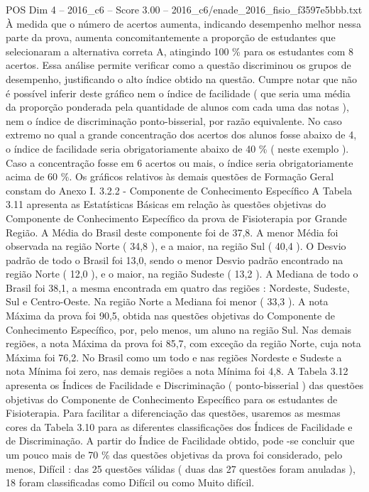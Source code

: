 \begin{textsample}{POS Dim 4 – 2016\_c6 – Score 3.00 – 2016\_c6/enade\_2016\_fisio\_f3597e5bbb.txt}
À medida que o número de acertos aumenta, indicando desempenho melhor nessa parte da prova, aumenta concomitantemente a proporção de estudantes que selecionaram a alternativa correta A, atingindo 100 \% para os estudantes com 8 acertos.
Essa análise permite verificar como a questão discriminou os grupos de desempenho, justificando o alto índice obtido na questão.
Cumpre notar que não é possível inferir deste gráfico nem o índice de facilidade ( que seria uma média da proporção ponderada pela quantidade de alunos com cada uma das notas ), nem o índice de discriminação ponto-bisserial, por razão equivalente.
No caso extremo no qual a grande concentração dos acertos dos alunos fosse abaixo de 4, o índice de facilidade seria obrigatoriamente abaixo de 40 \% ( neste exemplo ).
Caso a concentração fosse em 6 acertos ou mais, o índice seria obrigatoriamente acima de 60 \%.
Os gráficos relativos às demais questões de Formação Geral constam do Anexo I. 3.2.2 - Componente de Conhecimento Específico A Tabela 3.11 apresenta as Estatísticas Básicas em relação às questões objetivas do Componente de Conhecimento Específico da prova de Fisioterapia por Grande Região.
A Média do Brasil deste componente foi de 37,8.
A menor Média foi observada na região Norte ( 34,8 ), e a maior, na região Sul ( 40,4 ).
O Desvio padrão de todo o Brasil foi 13,0, sendo o menor Desvio padrão encontrado na região Norte ( 12,0 ), e o maior, na região Sudeste ( 13,2 ).
A Mediana de todo o Brasil foi 38,1, a mesma encontrada em quatro das regiões : Nordeste, Sudeste, Sul e Centro-Oeste.
Na região Norte a Mediana foi menor ( 33,3 ).
A nota Máxima da prova foi 90,5, obtida nas questões objetivas do Componente de Conhecimento Específico, por, pelo menos, um aluno na região Sul.
Nas demais regiões, a nota Máxima da prova foi 85,7, com exceção da região Norte, cuja nota Máxima foi 76,2.
No Brasil como um todo e nas regiões Nordeste e Sudeste a nota Mínima foi zero, nas demais regiões a nota Mínima foi 4,8.
A Tabela 3.12 apresenta os Índices de Facilidade e Discriminação ( ponto-bisserial ) das questões objetivas do Componente de Conhecimento Específico para os estudantes de Fisioterapia.
Para facilitar a diferenciação das questões, usaremos as mesmas cores da Tabela 3.10 para as diferentes classificações dos Índices de Facilidade e de Discriminação.
A partir do Índice de Facilidade obtido, pode -se concluir que um pouco mais de 70 \% das questões objetivas da prova foi considerado, pelo menos, Difícil : das 25 questões válidas ( duas das 27 questões foram anuladas ), 18 foram classificadas como Difícil ou como Muito difícil.

\end{textsample}
